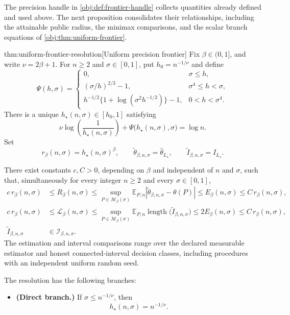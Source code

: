 \documentclass[11pt]{article}
\begin{document}
The precision handle in \cref{obj:def:frontier-handle} collects quantities already defined and used above. The next proposition consolidates their relationships, including the attainable public radius, the minimax comparisons, and the scalar branch equations of \cref{obj:thm:uniform-frontier}.

\begin{propositionv}{thm:uniform-frontier-resolution}[Uniform precision frontier]
Fix \(\beta\in(0,1]\), and write \(\nu=2\beta+1\). For \(n\ge2\) and \(\sigma\in[0,1]\), put \(h_0=n^{-1/\nu}\) and define
\[
\Psi(h,\sigma)=
\begin{cases}
0, & \sigma\le h,\\
(\sigma/h)^{2/3}-1, & \sigma^4\le h<\sigma,\\
h^{-1/2}\bigl\{1+\log(\sigma^2h^{-1/2})\bigr\}-1,
    & 0<h<\sigma^4.
\end{cases}
\]
There is a unique \(h_\star(n,\sigma)\in[h_0,1]\) satisfying
\[
\nu\log\!\left(\frac1{h_\star(n,\sigma)}\right)
+\Psi\bigl(h_\star(n,\sigma),\sigma\bigr)=\log n.
\]
Set
\[
r_\beta(n,\sigma)=h_\star(n,\sigma)^\beta,\qquad
\widetilde\theta_{\beta,n,\sigma}=\widehat\theta_{L_\star},
\qquad
\widetilde I_{\beta,n,\sigma}=I_{L_\star}.
\]

There exist constants \(c,C>0\), depending on \(\beta\) and independent of \(n\) and \(\sigma\), such that, simultaneously for every integer \(n\ge2\) and every \(\sigma\in[0,1]\),
\[
\begin{aligned}
c\,r_\beta(n,\sigma)
&\le R_\beta(n,\sigma)
\le \sup_{P\in\mathcal M_\beta(\sigma)}
   \mathbb E_{P,n}
   \left|\widetilde\theta_{\beta,n,\sigma}-\theta(P)\right|
\le E_\beta(n,\sigma)
\le C\,r_\beta(n,\sigma),\\
c\,r_\beta(n,\sigma)
&\le \mathcal L_\beta(n,\sigma)
\le \sup_{P\in\mathcal M_\beta(\sigma)}
   \mathbb E_{P,n}
   \operatorname{length}\bigl(\widetilde I_{\beta,n,\sigma}\bigr)
\le 2E_\beta(n,\sigma)
\le C\,r_\beta(n,\sigma),\\
\widetilde I_{\beta,n,\sigma}
&\in\mathcal I_{\beta,n,\sigma}.
\end{aligned}
\]
The estimation and interval comparisons range over the declared measurable estimator and honest connected-interval decision classes, including procedures with an independent uniform random seed.

The resolution has the following branches:
\begin{itemize}
\item \textbf{(Direct branch.)}
If \(\sigma\le n^{-1/\nu}\), then
\[
h_\star(n,\sigma)=n^{-1/\nu}.
\]


\end{itemize}
\end{propositionv}
\end{document}
